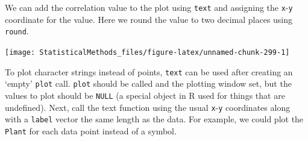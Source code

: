 \documentclass[
]{book}
\newenvironment{Shaded}{\begin{snugshade}}{\end{snugshade}}
\newcommand{\DataTypeTok}[1]{\textcolor[rgb]{0.13,0.29,0.53}{#1}}
\newcommand{\DecValTok}[1]{\textcolor[rgb]{0.00,0.00,0.81}{#1}}
\newcommand{\KeywordTok}[1]{\textcolor[rgb]{0.13,0.29,0.53}{\textbf{#1}}}
\newcommand{\NormalTok}[1]{#1}
\newcommand{\OperatorTok}[1]{\textcolor[rgb]{0.81,0.36,0.00}{\textbf{#1}}}
\newcommand{\StringTok}[1]{\textcolor[rgb]{0.31,0.60,0.02}{#1}}
\theoremstyle{definition}
\theoremstyle{definition}
\theoremstyle{definition}
\theoremstyle{remark}
\begin{document}
We can add the correlation value to the plot using \texttt{text} and assigning the \texttt{x}-\texttt{y} coordinate for the value. Here we round the value to two decimal places using \texttt{round}.

\begin{Shaded}
\end{Shaded}

\begin{center}\texttt{[image: StatisticalMethods\_files/figure-latex/unnamed-chunk-299-1]} \end{center}

To plot character strings instead of points, \texttt{text} can be used after creating an `empty' \texttt{plot} call. \texttt{plot} should be called and the plotting window set, but the values to plot should be \texttt{NULL} (a special object in R used for things that are undefined). Next, call the text function using the usual \texttt{x}-\texttt{y} coordinates along with a \texttt{label} vector the same length as the data. For example, we could plot the \texttt{Plant} for each data point instead of a symbol.
\end{document}
